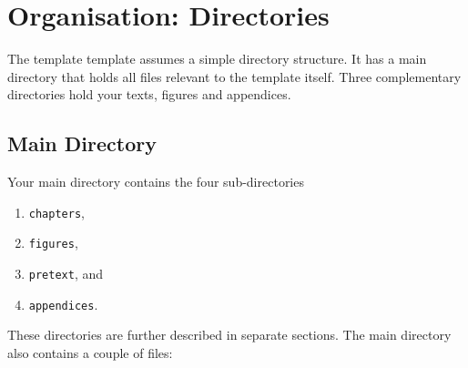 \section{Organisation: Directories}
\label{sec:introduction:folders}

The \acs{template} template assumes a simple directory structure.
It has a main directory that holds all files relevant to the template itself.
Three complementary directories hold your texts, figures and appendices.



\subsection{Main Directory}
\label{sec:introduction:folders:main}
Your main directory contains the four sub-directories
\begin{enumerate}
	\item \texttt{chapters},
	\item \texttt{figures},
	\item \texttt{pretext}, and
	\item \texttt{appendices}.
\end{enumerate}
These directories are further described in separate sections. The main
directory also contains a couple of files: 
